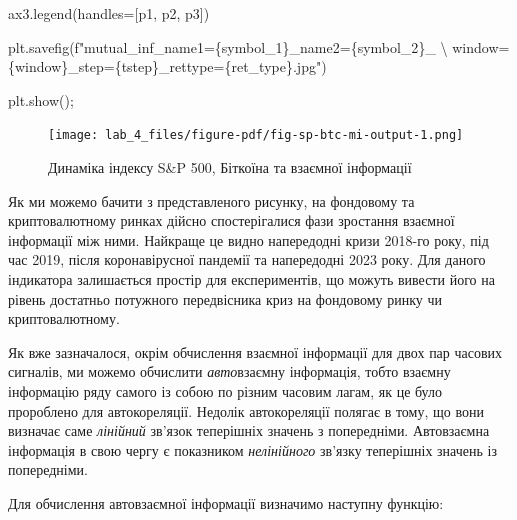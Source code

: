 \documentclass[
  letterpaper,
]{report}
\newenvironment{Shaded}{\begin{snugshade}}{\end{snugshade}}
\newcommand{\CharTok}[1]{\textcolor[rgb]{0.13,0.47,0.30}{#1}}
\newcommand{\NormalTok}[1]{\textcolor[rgb]{0.00,0.23,0.31}{#1}}
\newcommand{\OperatorTok}[1]{\textcolor[rgb]{0.37,0.37,0.37}{#1}}
\newcommand{\SpecialCharTok}[1]{\textcolor[rgb]{0.37,0.37,0.37}{#1}}
\newcommand{\SpecialStringTok}[1]{\textcolor[rgb]{0.13,0.47,0.30}{#1}}
\begin{document}
\begin{Shaded}
\begin{Highlighting}[]
\NormalTok{ax3.legend(handles}\OperatorTok{=}\NormalTok{[p1, p2, p3])}

\NormalTok{plt.savefig(}\SpecialStringTok{f"mutual\_inf\_name1=}\SpecialCharTok{\{}\NormalTok{symbol\_1}\SpecialCharTok{\}}\SpecialStringTok{\_name2=}\SpecialCharTok{\{}\NormalTok{symbol\_2}\SpecialCharTok{\}}\SpecialStringTok{\_ }\CharTok{\textbackslash{}}
\SpecialStringTok{    window=}\SpecialCharTok{\{}\NormalTok{window}\SpecialCharTok{\}}\SpecialStringTok{\_step=}\SpecialCharTok{\{}\NormalTok{tstep}\SpecialCharTok{\}}\SpecialStringTok{\_rettype=}\SpecialCharTok{\{}\NormalTok{ret\_type}\SpecialCharTok{\}}\SpecialStringTok{.jpg"}\NormalTok{)}

\NormalTok{plt.show()}\OperatorTok{;}
\end{Highlighting}
\end{Shaded}

\begin{figure}[H]

{\centering \texttt{[image: lab\_4\_files/figure-pdf/fig-sp-btc-mi-output-1.png]}

}

\caption{\label{fig-sp-btc-mi}Динаміка індексу S\&P 500, Біткоїна та
взаємної інформації}

\end{figure}

Як ми можемо бачити з представленого рисунку, на фондовому та
криптовалютному ринках дійсно спостерігалися фази зростання взаємної
інформації між ними. Найкраще це видно напередодні кризи 2018-го року,
під час 2019, після коронавірусної пандемії та напередодні 2023 року.
Для даного індикатора залишається простір для експериментів, що можуть
вивести його на рівень достатньо потужного передвісника криз на
фондовому ринку чи криптовалютному.

Як вже зазначалося, окрім обчислення взаємної інформації для двох пар
часових сигналів, ми можемо обчислити \emph{авто}взаємну інформація,
тобто взаємну інформацію ряду самого із собою по різним часовим лагам,
як це було пророблено для автокореляції. Недолік автокореляції полягає в
тому, що вони визначає саме \emph{лінійний} зв'язок теперішніх значень з
попередніми. Автовзаємна інформація в свою чергу є показником
\emph{нелінійного} зв'язку теперішніх значень із попередніми.

Для обчислення автовзаємної інформації визначимо наступну функцію:
\end{document}
